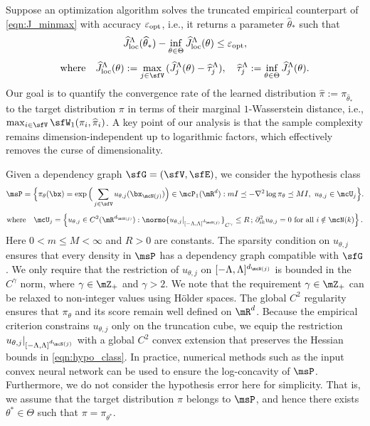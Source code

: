 \documentclass[11pt]{article}
\begin{document}
%
Suppose an optimization algorithm solves the truncated empirical counterpart of \eqref{eqn:J_minmax} with accuracy $\varepsilon_{\rm opt}$, i.e., it returns a parameter $\widehat{\theta}_*$ such that
\begin{equation}
\label{eqn:theta_emp}
   \widehat{J}_{\rm loc}^\Lambda (\widehat{\theta}_*) - \inf_{\theta\in\Theta} \widehat{J}_{\rm loc}^\Lambda(\theta) \le \varepsilon_{\rm opt},
\end{equation}
\begin{equation}
\label{eqn:J_loc_emp}
    \text{where} \quad \widehat{J}_{\rm loc}^\Lambda(\theta) := \max_{j\in \sfV}\, ( \widehat{J}_j^\Lambda(\theta) - \widehat{\tau}_j^\Lambda), \quad \widehat{\tau}_j^\Lambda := \inf_{\theta\in\Theta} \widehat{J}_j^\Lambda(\theta).
\end{equation}
Our goal is to quantify the convergence rate of the learned distribution $\widehat{\pi} := \pi_{\widehat{\theta}_*}$ to the target distribution $\pi$ in terms of their marginal $1$-Wasserstein distance, i.e., $\max_{i\in \sfV} \sfW_1(\pi_i,\widehat{\pi}_i)$.
%
A key point of our analysis is that the sample complexity remains dimension-independent up to logarithmic factors, which effectively removes the curse of dimensionality.

Given a dependency graph $\sfG=(\sfV,\sfE)$, we consider the hypothesis class
\begin{equation}
\label{eqn:hypo_class}
    \msP = \Big\{ \pi_\theta(\bx) = \exp \Big( \sum_{j\in \sfV} u_{\theta,j}(\bx_{\mcN(j)}) \Big) \in \mcP_1(\mR^d) : mI \preceq - \nabla^2 \log \pi_\theta \preceq MI,~u_{\theta,j} \in \mcU_j \Big\}.
\end{equation}
\begin{equation}
\label{eqn:U_j}
    \text{where} \quad \mcU_j = \left\{ u_{\theta,j} \in C^2(\mR^{d_{\mcN(j)}}) :
    \normo{u_{\theta,j}|_{[-\Lambda,\Lambda]^{d_{\mcN(j)}}}}_{C^\gamma} \le R\,;\,
    \partial_{ik}^2u_{\theta,j}=0~\text{for all }i\notin\mcN(k) \right\}.
\end{equation}
Here $0< m\le M< \infty$ and $R>0$ are constants. The sparsity condition on $u_{\theta,j}$ ensures that every density in $\msP$ has a dependency graph compatible with $\sfG$.
We only require that the restriction of $u_{\theta,j}$ on $[-\Lambda,\Lambda]^{d_{\mcN(j)}}$ is bounded in the $C^\gamma$ norm, where $\gamma\in \mZ_+$ and $\gamma > 2$.
We note that the requirement $\gamma \in \mZ_+$ can be relaxed to non-integer values using H\"older spaces.
The global $C^2$ regularity ensures that $\pi_\theta$ and its score remain well defined on $\mR^d$.
Because the empirical criterion constrains $u_{\theta,j}$ only on the truncation cube, we equip the restriction $u_{\theta,j}|_{[-\Lambda,\Lambda]^{d_{\mcN(j)}}}$ with a global $C^2$ convex extension that preserves the Hessian bounds in \eqref{eqn:hypo_class}.
%
In practice, numerical methods such as the input convex neural network \cite{pmlr-v70-amos17b} can be used to ensure the log-concavity of $\msP$. Furthermore, we do not consider the hypothesis error here for simplicity. That is, we assume that the target distribution $\pi$ belongs to $\msP$, and hence there exists $\theta^* \in \Theta$ such that $\pi = \pi_{\theta^*}$.
\end{document}
